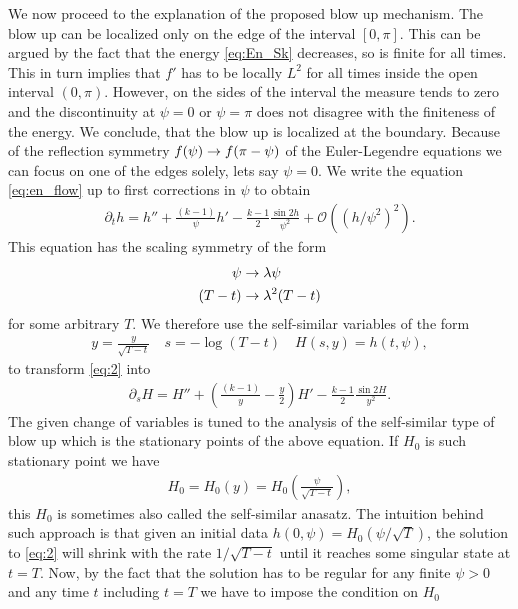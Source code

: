 We now proceed to the explanation of the proposed blow up mechanism.
The blow up can be localized only on the edge of the interval
$[0,\pi]$. This can be argued by the fact that the energy
\eqref{eq:En_Sk} decreases, so is finite for all times.  This in turn
implies that $f'$ has to be locally $L^2$ for all times inside the
open interval $(0,\pi)$. However, on the sides of the interval the
measure tends to zero and the discontinuity at $\psi=0$ or $\psi=\pi$
does not disagree with the finiteness of the energy. We conclude, that
the blow up is localized at the boundary. Because of the reflection
symmetry $f(\psi)\rightarrow f(\pi-\psi)$ of the Euler-Legendre equations we
can focus on one of the edges solely, lets say $\psi=0$. We write the
equation \eqref{eq:en_flow} up to first corrections in $\psi$ to
obtain
\begin{align}
  \label{eq:2}
  \partial_t
  h=h''+\frac{(k-1)}{\psi}h'-\frac{k-1}{2}\frac{\sin2h}{\psi^2}+\mathcal{O}((h/\psi^2)^2).
\end{align}
This equation has the scaling symmetry of the form
\begin{align}
  \label{eq:6}
  \psi&\rightarrow\lambda\psi \\
  (T-t)&\rightarrow\lambda^2(T-t)
\end{align}
for some arbitrary $T$. We therefore use the self-similar variables of
the form
\begin{align}
  \label{eq:3}
  y=\frac{y}{\sqrt{T-t}}\quad s=-\log(T-t)\quad H(s,y)=h(t,\psi),
\end{align}
to transform \eqref{eq:2} into
\begin{align}
  \label{eq:4}
  \partial_s
  H=H''+\left(\frac{(k-1)}{y}-\frac{y}{2}\right)H'-\frac{k-1}{2}\frac{\sin2H}{y^2}.
\end{align}
The given change of variables is tuned to the analysis of the
self-similar type of blow up which is the stationary points of the
above equation. If $H_0$ is such stationary point we have
\begin{align}
  \label{eq:5}
  H_0=H_0(y)=H_0\left(\frac{\psi}{\sqrt{T-t}}\right),
\end{align}
this $H_0$ is sometimes also called the self-similar anasatz. The
intuition behind such approach is that given an initial data
$h(0,\psi)=H_0(\psi/\sqrt{T})$, the solution to \eqref{eq:2} will
shrink with the rate $1/\sqrt{T-t}$ until it reaches some singular
state at $t=T$. Now, by the fact that the solution has to be regular
for any finite $\psi>0$ and any time $t$ including $t=T$ we have to
impose the condition on $H_0$
